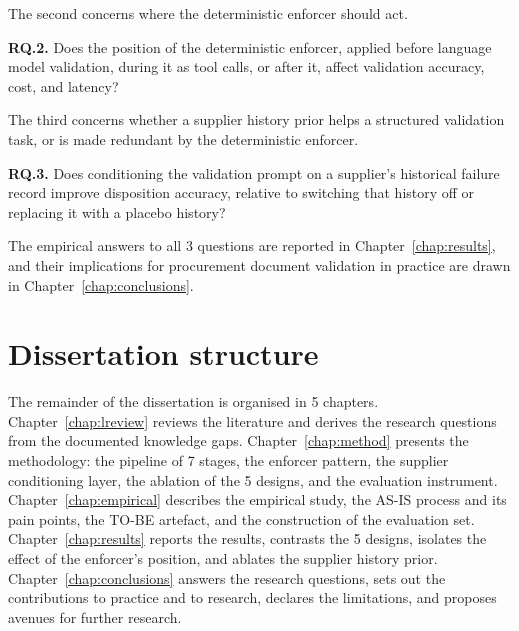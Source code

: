 The second concerns where the deterministic enforcer should act.

\textbf{RQ.2.} Does the position of the deterministic enforcer, applied before language model validation, during it as tool calls, or after it, affect validation accuracy, cost, and latency?

The third concerns whether a supplier history prior helps a structured validation task, or is made redundant by the deterministic enforcer.

\textbf{RQ.3.} Does conditioning the validation prompt on a supplier's historical failure record improve disposition accuracy, relative to switching that history off or replacing it with a placebo history?

The empirical answers to all 3 questions are reported in Chapter~\ref{chap:results}, and their implications for procurement document validation in practice are drawn in Chapter~\ref{chap:conclusions}.


\section{Dissertation structure}
\label{sec:intro:struct}

The remainder of the dissertation is organised in 5 chapters. Chapter~\ref{chap:lreview} reviews the literature and derives the research questions from the documented knowledge gaps. Chapter~\ref{chap:method} presents the methodology: the pipeline of 7 stages, the enforcer pattern, the supplier conditioning layer, the ablation of the 5 designs, and the evaluation instrument. Chapter~\ref{chap:empirical} describes the empirical study, the AS-IS process and its pain points, the TO-BE artefact, and the construction of the evaluation set. Chapter~\ref{chap:results} reports the results, contrasts the 5 designs, isolates the effect of the enforcer's position, and ablates the supplier history prior. Chapter~\ref{chap:conclusions} answers the research questions, sets out the contributions to practice and to research, declares the limitations, and proposes avenues for further research.
